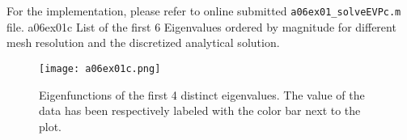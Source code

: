 For the implementation, please refer to online submitted \texttt{a06ex01\_solveEVPc.m} file.
%
\vspace*{2\FigUpperVSpace}
		 {a06ex01c}
		 {List of the first 6 Eigenvalues ordered by magnitude for different mesh resolution and the discretized analytical solution.}
%
\begin{figure}[H]
	\centering
	\texttt{[image: a06ex01c.png]} 
	\caption{Eigenfunctions of the first 4 distinct eigenvalues.
			 The value of the data has been respectively labeled with the color bar next to the plot.}
	\label{fig:a06ex01c}
\end{figure}
%
%

%

%

%


%

%

%
